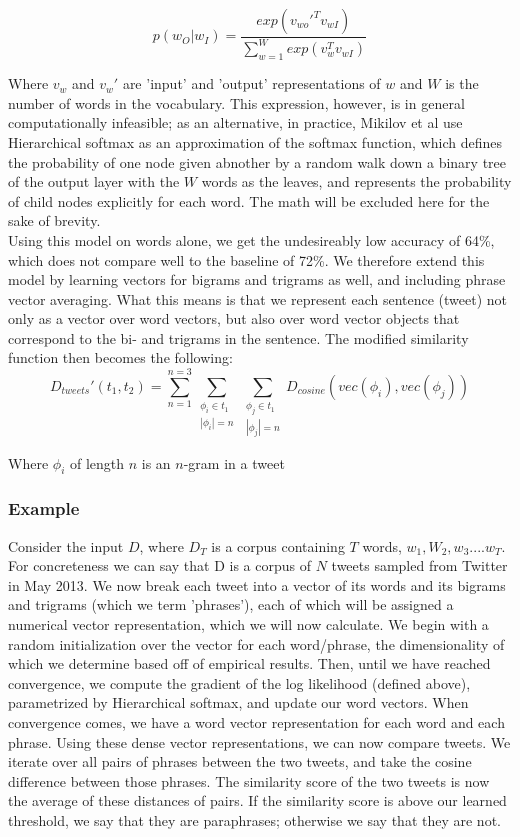 \documentclass[conference]{IEEEtran}
\begin{document}
$$p(w_O|w_I) = \frac{exp(v_{wo}'^Tv_{wI})}{\sum_{w=1}^W exp(v_w^Tv_{wI})}$$

Where $v_w$ and $v_w'$ are 'input' and 'output' representations of $w$ and $W$ is the number of words in the vocabulary.  This expression, however, is in general computationally infeasible; as an alternative, in practice, Mikilov et al use Hierarchical softmax as an approximation of the softmax function, which defines the probability of one node given abnother by a random walk down a binary tree of the output layer with the  $W$ words as the leaves, and represents the probability of child nodes explicitly for each word.  The math will be excluded here for the sake of brevity. \\

\indent Using this model on words alone, we get the undesireably low accuracy of 64\%, which does not compare well to the baseline of 72\%.  We therefore extend this model by learning vectors for bigrams and trigrams as well, and including phrase vector averaging.  What this means is that we represent each sentence (tweet) not only as a vector over word vectors, but also over word vector objects that correspond to the bi- and trigrams in the sentence.  The modified similarity function then becomes the following:\\

$$D_{tweets}'(t_1, t_2) = \sum_{n=1}^{n=3} \sum_{
\substack{\phi_i \in t_1 \\  |\phi_i| = n}} 
\sum_{\substack{\phi_j \in t_1 \\  |\phi_j| = n}} 
D_{cosine}(vec(\phi_i), vec(\phi_j))$$

Where $\phi_i$ of length $n$ is an $n$-gram in a tweet

\subsubsection{Example}
Consider the input $D$, where $D_T$ is a corpus containing $T$ words, $w_1, W_2, w_3 .... w_T$. For concreteness we can say that D is a corpus of $N$ tweets sampled from Twitter in May 2013.  We now break each tweet into a vector of its words and its bigrams and trigrams (which we term 'phrases'), each of which will be assigned a numerical vector representation, which we will now calculate.  We begin with a random initialization over the vector for each word/phrase, the dimensionality of which we determine based off of empirical results. Then, until we have reached convergence, we compute the gradient of the log likelihood (defined above), parametrized by Hierarchical softmax, and update our word vectors. When convergence comes, we have a word vector representation for each word and each phrase.  
Using these dense vector representations, we can now compare tweets.  We iterate over all pairs of phrases between the two tweets, and take the cosine difference between those phrases.  The similarity score of the two tweets is now the average of these distances of pairs.  If the similarity score is above our learned threshold, we say that they are paraphrases; otherwise we say that they are not.\\
\end{document}
